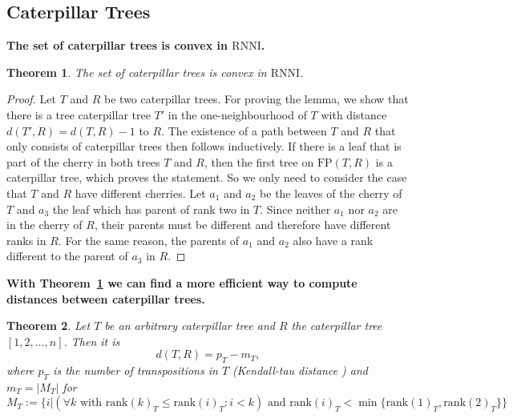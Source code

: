 \documentclass[11pt]{amsart}
\newtheorem{theorem}{Theorem}
\newcommand{\tocite}{ {\color{red}\fbox{CITATION}} }
\newcommand{\rnni}{\mathrm{RNNI}}
\newcommand{\rank}{\mathrm{rank}}
\newcommand{\fp}{\mathrm{FP}}
\newcommand{\summary}[1]{\textbf{#1}} %
\begin{document}
\subsection{Caterpillar Trees}

\summary{The set of caterpillar trees is convex in $\rnni$.}
\begin{theorem}
	The set of caterpillar trees is convex in $\rnni$.
	\label{thm:caterpillar_convex_rnni}
\end{theorem}

\begin{proof}
	Let $T$ and $R$ be two caterpillar trees.
	For proving the lemma, we show that there is a tree caterpillar tree $T'$ in the one-neighbourhood of $T$ with distance $d(T',R) = d(T,R) - 1$ to $R$.
	The existence of a path between $T$ and $R$ that only consists of caterpillar trees then follows inductively.
	If there is a leaf that is part of the cherry in both trees $T$ and $R$, then the first tree on $\fp(T,R)$ is a caterpillar tree, which proves the statement.
	So we only need to consider the case that $T$ and $R$ have different cherries.
	Let $a_1$ and $a_2$ be the leaves of the cherry of $T$ and $a_3$ the leaf which has parent of rank two in $T$.
	Since neither $a_1$ nor $a_2$ are in the cherry of $R$, their parents must be different and therefore have different ranks in $R$.
	For the same reason, the parents of $a_1$ and $a_2$ also have a rank different to the parent of $a_3$ in $R$.
\end{proof}

\summary{With Theorem~\ref{thm:caterpillar_convex_rnni} we can find a more efficient way to compute distances between caterpillar trees.}

\begin{theorem}
	Let $T$ be an arbitrary caterpillar tree and $R$ the caterpillar tree $[1,2, \ldots, n]$.
	Then it is
	\[d(T,R) = p_T - m_T,\]
	where $p_T$ is the number of transpositions in $T$ (Kendall-tau distance \tocite) and $m_T = |M_T|$ for
	\[{M_T} := \{i| (\forall k \text{ with } \rank(k)_T \leq \rank(i)_T: i < k) \text{ and } \rank(i)_T < \min\{\rank(1)_T, \rank(2)_T\}\}\]
	\label{thm:caterpillar_distance_formula}
\end{theorem}
\end{document}
